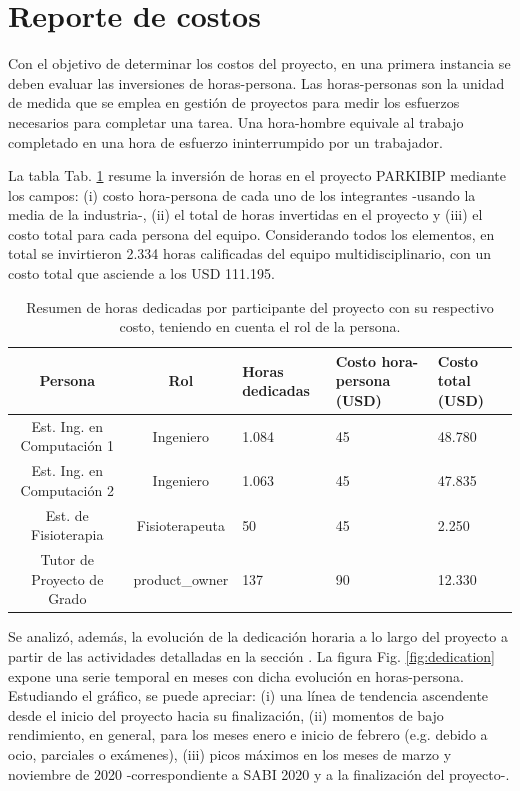 \section{Reporte de costos}

Con el objetivo de determinar los costos del proyecto, en una primera instancia se deben evaluar las inversiones de horas-persona. Las horas-personas son la unidad de medida que se emplea en gestión de proyectos para medir los esfuerzos necesarios para completar una tarea. Una hora-hombre equivale al trabajo completado en una hora de esfuerzo ininterrumpido por un trabajador. 

La tabla Tab. \ref{TAB:expenses} resume la inversión de horas en el proyecto PARKIBIP mediante los campos: (i) costo hora-persona de cada uno de los integrantes -usando la media de la industria-, (ii) el total de horas invertidas en el proyecto y (iii) el costo total para cada persona del equipo. Considerando todos los elementos, en total se invirtieron 2.334 horas calificadas del equipo multidisciplinario, con un costo total que asciende a los USD 111.195.

\begin{table}[H]
\caption{Resumen de horas dedicadas por participante del proyecto con su respectivo costo, teniendo en cuenta el rol de la persona.}
\centering
\hspace*{-2.5cm}%
\begin{tabular}{|c|c|p{2.0cm}|p{2.7cm}|p{2.5cm}|}
\hline
\textbf{Persona} & \textbf{Rol} & \textbf{Horas dedicadas} & \textbf{Costo hora-persona (USD)} & \textbf{Costo total (USD)}  \\ \hline
Est. Ing. en Computación 1 & Ingeniero & 1.084 & 45 & 48.780 \\ \hline
Est. Ing. en Computación 2 & Ingeniero & 1.063 & 45 & 47.835 \\ \hline
Est. de Fisioterapia & Fisioterapeuta & 50 & 45 & 2.250 \\ \hline
Tutor de Proyecto de Grado & \gls{product_owner} & 137 & 90 & 12.330 \\ \hline
\end{tabular}
\hspace*{-1cm}
\label{TAB:expenses}
\end{table}

Se analizó, además, la evolución de la dedicación horaria a lo largo del proyecto a partir de las actividades detalladas en la sección . La figura Fig. \ref{fig:dedication} expone una serie temporal en meses con dicha evolución en horas-persona. Estudiando el gráfico, se puede apreciar: (i) una línea de tendencia ascendente desde el inicio del proyecto hacia su finalización, (ii) momentos de bajo rendimiento, en general, para los meses enero e inicio de febrero (e.g. debido a ocio, parciales o exámenes), (iii) picos máximos en los meses de marzo y noviembre de 2020 -correspondiente a SABI 2020 y a la finalización del proyecto-.

